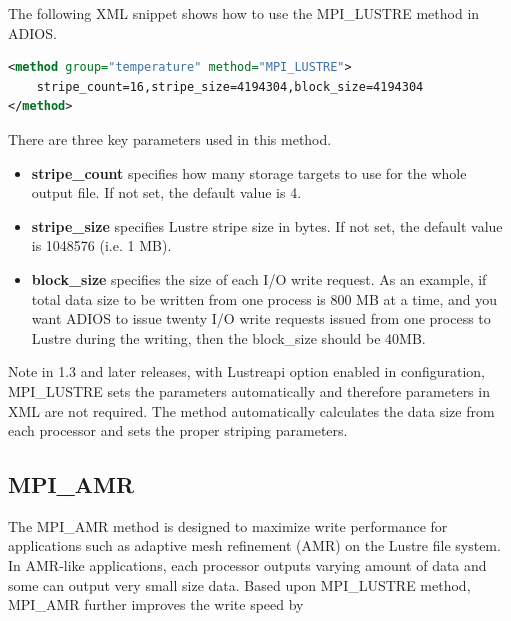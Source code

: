 The following XML snippet shows how to use the MPI\_LUSTRE method in ADIOS. 
\begin{lstlisting}[language=XML]
<method group="temperature" method="MPI_LUSTRE">
	stripe_count=16,stripe_size=4194304,block_size=4194304 
</method>
\end{lstlisting}

There are three key parameters used in this method.
\begin{itemize}
\item \textbf{stripe\_count} specifies how many storage targets to 
use for the whole output file. If not set, the default value is 4.

\item \textbf{stripe\_size}  specifies Lustre stripe size in bytes. 
If not set, the default value is 1048576 (i.e. 1 MB).

\item \textbf{block\_size}   specifies the size of each I/O write 
request. As an example, if total data size to be written from one process is 800 
MB at a time, and you want ADIOS to issue twenty I/O write requests issued from 
one process to Lustre during the writing, then the block\_size should be 40MB.
\end{itemize}

Note in 1.3 and later releases, with Lustreapi option enabled in configuration, 
MPI\_LUSTRE sets the parameters automatically and therefore parameters in XML are 
not required.  The method automatically calculates the data size from each processor 
and sets the proper striping parameters. 

\subsection{MPI\_AMR}
\label{section-method-mpiamr}

The MPI\_AMR method is designed to maximize write performance for applications 
such as adaptive mesh refinement (AMR) on the Lustre file system. In AMR-like applications, 
each processor outputs varying amount of data and some can output very small size 
data. Based upon MPI\_LUSTRE method, MPI\_AMR further improves the write speed 
by 

